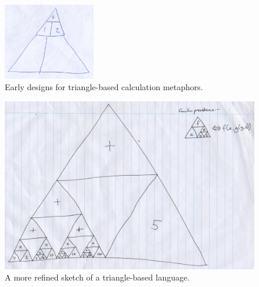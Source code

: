 \documentclass[12pt,twoside,notitlepage,xetex]{report}
\begin{document}
\begin{center}
\begin{figure}[H]
\begin{center}
{{\begin{center}
\includegraphics[width=4cm]{figs/mockups/sketches/42/42a.jpg}
\end{center}}}
\end{center}
\caption{Early designs for triangle-based calculation metaphors.}
\end{figure}
\end{center}

\begin{center}
\begin{figure}
\begin{center}
\includegraphics[width=\textwidth]{figs/mockups/sketches/31/31a.jpg}
\end{center}
\caption{A more refined sketch of a triangle-based language.}
\end{figure}
\end{center}
\end{document}
